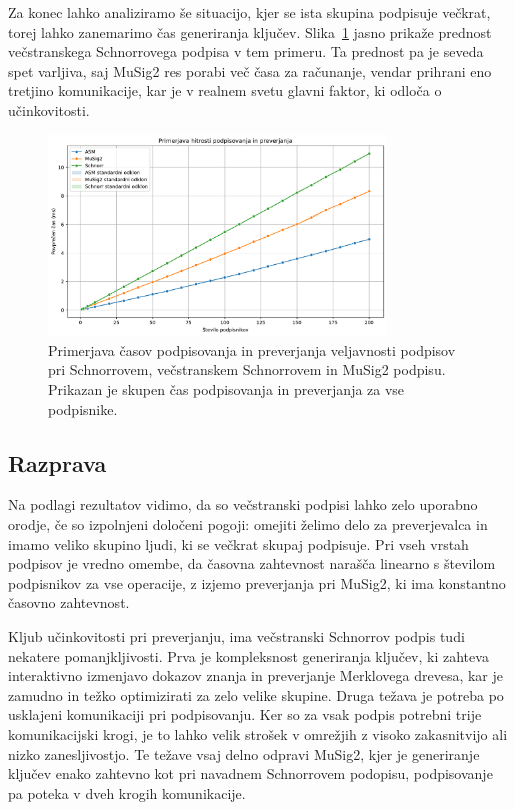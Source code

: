 \documentclass[isrm2, tisk]{fmfdelo}
\begin{document}
Za konec lahko analiziramo še situacijo, kjer se ista skupina podpisuje večkrat, torej lahko zanemarimo
čas generiranja ključev. Slika~\ref{fig:podpis-preverjanje} jasno prikaže prednost večstranskega Schnorrovega
podpisa v tem primeru. Ta prednost pa je seveda spet varljiva, saj MuSig2 res porabi več časa za
računanje, vendar prihrani eno tretjino komunikacije, kar je v realnem svetu glavni faktor, ki
odloča o učinkovitosti.

\begin{figure}[ht]
  \centering
  \includegraphics[width=0.8\textwidth]{images/benchmark_SigningVerification.pdf}
  \caption[Podpisovanje in preverjanje.]{Primerjava časov podpisovanja in preverjanja veljavnosti
    podpisov pri Schnorrovem, večstranskem Schnorrovem in MuSig2 podpisu. Prikazan je skupen čas
    podpisovanja in preverjanja za vse podpisnike.}
  \label{fig:podpis-preverjanje}
\end{figure}

\subsection{Razprava}
Na podlagi rezultatov vidimo, da so večstranski podpisi lahko zelo uporabno orodje, če so
izpolnjeni določeni pogoji: omejiti želimo delo za preverjevalca in imamo veliko skupino ljudi, ki
se večkrat skupaj podpisuje. Pri vseh vrstah podpisov je vredno omembe, da časovna zahtevnost narašča
linearno s številom podpisnikov za vse operacije, z izjemo preverjanja pri MuSig2, ki ima konstantno
časovno zahtevnost.

Kljub učinkovitosti pri preverjanju, ima večstranski Schnorrov podpis tudi nekatere pomanjkljivosti.
Prva je kompleksnost generiranja ključev, ki zahteva interaktivno izmenjavo dokazov znanja in
preverjanje Merklovega drevesa, kar je zamudno in težko optimizirati za zelo velike skupine.
Druga težava je potreba po usklajeni komunikaciji pri podpisovanju. Ker so za vsak podpis potrebni trije
komunikacijski krogi, je to lahko velik strošek v omrežjih z visoko zakasnitvijo ali nizko zanesljivostjo.
Te težave vsaj delno odpravi MuSig2, kjer je generiranje ključev enako zahtevno kot pri navadnem
Schnorrovem podopisu, podpisovanje pa poteka v dveh krogih komunikacije. 
\end{document}
